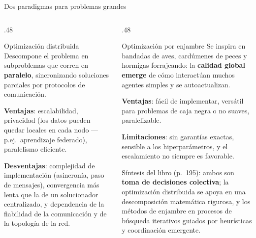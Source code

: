 \documentclass[10pt,aspectratio=169]{beamer}
\begin{document}
\begin{frame}{Dos paradigmas para problemas grandes}
  \small
  \begin{columns}[T,onlytextwidth]
    \begin{column}{.48\textwidth}
      \begin{block}{Optimización distribuida}
        \small
        Descompone el problema en subproblemas que corren en \textbf{paralelo},
        sincronizando soluciones parciales por protocolos de comunicación.
        \par\medskip
        \textbf{Ventajas}: escalabilidad, privacidad (los datos pueden quedar
        locales en cada nodo --- p.ej.~aprendizaje federado), paralelismo
        eficiente.
        \par\medskip
        \textbf{Desventajas}: complejidad de implementación (asincronía,
        paso de mensajes), convergencia más lenta que la de un solucionador
        centralizado, y dependencia de la fiabilidad de la comunicación y de la
        topología de la red.
      \end{block}
    \end{column}
    \begin{column}{.48\textwidth}
      \begin{block}{Optimización por enjambre}
        \small
        Se inspira en bandadas de aves, cardúmenes de peces y hormigas
        forrajeando: la \textbf{calidad global emerge} de cómo interactúan
        muchos agentes simples y se autoactualizan.
        \par\medskip
        \textbf{Ventajas}: fácil de implementar, versátil para problemas de caja
        negra o no suaves, paralelizable.
        \par\medskip
        \textbf{Limitaciones}: sin garantías exactas, sensible a los
        hiperparámetros, y el escalamiento no siempre es favorable.
      \end{block}
      \vspace{1mm}
      {\footnotesize\color{gray}
       Síntesis del libro (p.~195): ambos son \textbf{toma de decisiones
       colectiva}; la optimización distribuida se apoya en una descomposición
       matemática rigurosa, y los métodos de enjambre en procesos de búsqueda
       iterativos guiados por heurísticas y coordinación emergente.}
    \end{column}
  \end{columns}
\end{frame}
\end{document}
